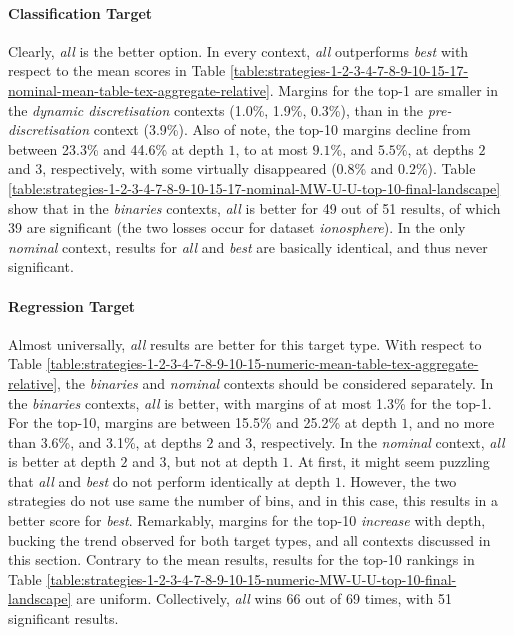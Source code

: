 \documentclass[smallextended]{svjour3}
\newcommand{\dataset}{\emph}
\newcommand{\parameter}{\emph}
\newcommand{\dyndis}{\parameter{dynamic discretisation}}
\newcommand{\predis}{\parameter{pre-discretisation}}
\newcommand{\binaries}{\parameter{binaries}}
\newcommand{\nominal}{\parameter{nominal}}
\newcommand{\all}{\parameter{all}}
\newcommand{\best}{\parameter{best}}
\begin{document}
\paragraph{Classification Target}
Clearly, \all{} is the better option.
In every context, \all{} outperforms \best{} with respect to the mean scores in Table \ref{table:strategies-1-2-3-4-7-8-9-10-15-17-nominal-mean-table-tex-aggregate-relative}.
Margins for the top-1 are smaller in the \dyndis{} contexts (1.0\%, 1.9\%, 0.3\%), than in the \predis{} context (3.9\%).
Also of note, the top-10 margins decline from between 23.3\% and 44.6\% at depth $1$, to at most $9.1\%$, and $5.5\%$, at depths $2$ and $3$, respectively, with some virtually disappeared (0.8\% and 0.2\%).
Table \ref{table:strategies-1-2-3-4-7-8-9-10-15-17-nominal-MW-U-U-top-10-final-landscape} show that in the \binaries{} contexts, \all{} is better for 49 out of 51 results, of which 39 are significant (the two losses occur for dataset \dataset{ionosphere}).
In the only \nominal{} context, results for \all{} and \best{} are basically identical, and thus never significant.
		
\paragraph{Regression Target}
Almost universally, \all{} results are better for this target type.
With respect to Table \ref{table:strategies-1-2-3-4-7-8-9-10-15-numeric-mean-table-tex-aggregate-relative}, the \binaries{} and \nominal{} contexts should be considered separately.
In the \binaries{} contexts, \all{} is better, with margins of at most 1.3\% for the top-1.
For the top-10, margins are between 15.5\% and 25.2\% at depth $1$, and no more than 3.6\%, and 3.1\%, at depths $2$ and $3$, respectively.
In the \nominal{} context, \all{} is better at depth $2$ and $3$, but not at depth $1$.
At first, it might seem puzzling that \all{} and \best{} do not perform identically at depth $1$.
However, the two strategies do not use same the number of bins, and in this case, this results in a better score for \best{}.
Remarkably, margins for the top-10 \emph{increase} with depth, bucking the trend observed for both target types, and all contexts discussed in this section.
Contrary to the mean results, results for the top-10 rankings in Table \ref{table:strategies-1-2-3-4-7-8-9-10-15-numeric-MW-U-U-top-10-final-landscape} are uniform.
Collectively, \all{} wins 66 out of 69 times, with 51 significant results.
\end{document}
